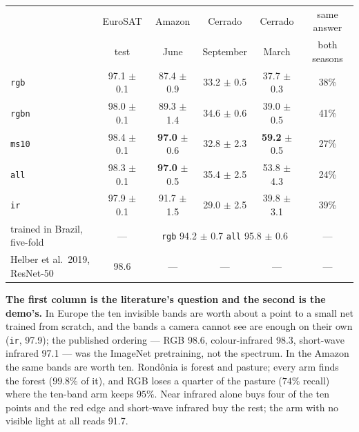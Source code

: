 \begin{center}
\footnotesize
\setlength{\tabcolsep}{5pt}
\begin{tabular}{l c c c c c}
\hline
& EuroSAT & Amazon & Cerrado & Cerrado & same answer \\
& test & June & September & March & both seasons \\
\hline
\texttt{rgb}  & 97.1 $\pm$ 0.1 & 87.4 $\pm$ 0.9 & 33.2 $\pm$ 0.5 & 37.7 $\pm$ 0.3 & 38\% \\
\texttt{rgbn} & 98.0 $\pm$ 0.1 & 89.3 $\pm$ 1.4 & 34.6 $\pm$ 0.6 & 39.0 $\pm$ 0.5 & 41\% \\
\texttt{ms10} & 98.4 $\pm$ 0.1 & \textbf{97.0} $\pm$ 0.6 & 32.8 $\pm$ 2.3 & \textbf{59.2} $\pm$ 0.5 & 27\% \\
\texttt{all}  & 98.3 $\pm$ 0.1 & \textbf{97.0} $\pm$ 0.5 & 35.4 $\pm$ 2.5 & 53.8 $\pm$ 4.3 & 24\% \\
\texttt{ir}   & 97.9 $\pm$ 0.1 & 91.7 $\pm$ 1.5 & 29.0 $\pm$ 2.5 & 39.8 $\pm$ 3.1 & 39\% \\
\hline
trained in Brazil, five-fold & --- & \multicolumn{3}{c}{\texttt{rgb} 94.2 $\pm$ 0.7 \quad \texttt{all} 95.8 $\pm$ 0.6} & --- \\
Helber et al.\ 2019, ResNet-50 & 98.6 & --- & --- & --- & --- \\
\hline
\end{tabular}
\end{center}

\noindent \textbf{The first column is the literature's question and the
second is the demo's.} In Europe the ten invisible bands are worth about a
point to a small net trained from scratch, and the bands a camera cannot
see are enough on their own (\texttt{ir}, 97.9); the published ordering
--- RGB 98.6, colour-infrared 98.3, short-wave infrared 97.1 --- was the
ImageNet pretraining, not the spectrum. In the Amazon the
same bands are worth ten. Rond\^onia is forest and pasture; every arm finds
the forest ($99.8\%$ of it), and RGB loses a quarter of the pasture ($74\%$
recall) where the ten-band arm keeps $95\%$. Near infrared alone buys four
of the ten points and the red edge and short-wave infrared buy the rest;
the arm with no visible light at all reads 91.7.

